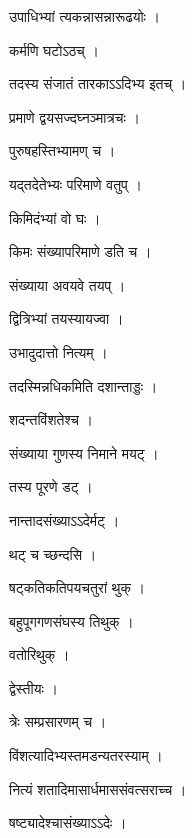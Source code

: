 \documentclass[10pt, openany]{book}
\begin{document}
\noindent उपाधिभ्यां त्यकन्नासन्नारूढयोः ।

\noindent कर्मणि घटोऽठच् ।

\noindent तदस्य संजातं तारकाऽऽदिभ्य इतच् ।

\noindent प्रमाणे द्वयसज्दघ्नञ्मात्रचः ।

\noindent पुरुषहस्तिभ्यामण् च ।

\noindent यद्तदेतेभ्यः परिमाणे वतुप् ।

\noindent किमिदंभ्यां वो घः ।

\noindent किमः संख्यापरिमाणे डति च ।

\noindent संख्याया अवयवे तयप् ।

\noindent द्वित्रिभ्यां तयस्यायज्वा ।

\noindent उभादुदात्तो नित्यम् ।

\noindent तदस्मिन्नधिकमिति दशान्ताड्डः ।

\noindent शदन्तविंशतेश्च ।

\noindent संख्याया गुणस्य निमाने मयट् ।

\noindent तस्य पूरणे डट् ।

\noindent नान्तादसंख्याऽऽदेर्मट् ।

\noindent थट् च च्छन्दसि ।

\noindent षट्कतिकतिपयचतुरां थुक् ।

\noindent बहुपूगगणसंघस्य तिथुक् ।

\noindent वतोरिथुक् ।

\noindent द्वेस्तीयः ।

\noindent त्रेः सम्प्रसारणम् च ।

\noindent विंशत्यादिभ्यस्तमडन्यतरस्याम् ।

\noindent नित्यं शतादिमासार्धमाससंवत्सराच्च ।

\noindent षष्ट्यादेश्चासंख्याऽऽदेः ।
\end{document}

